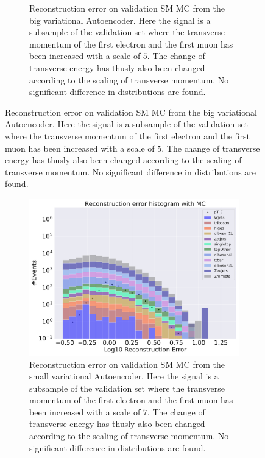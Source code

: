 \begin{figure}[h!]
\begin{subfigure}{.45\textwidth}
        \caption{Reconstruction error on validation SM MC from the big variational Autoencoder. Here the signal is a subsample of the validation 
        set where the transverse momentum of the first electron and the first muon has been increased with a scale of $5$. The change of transverse 
        energy has thusly also been changed according to the scaling of transverse momentum. No significant difference in distributions are found. }
        \label{fig:VAE_big_pt_5}
    \end{subfigure}
    \hfill 
    \label{fig:VAE_big_small_pt_5}
\end{figure}


\begin{figure}[h!]
    \centering
    \begin{subfigure}{.45\textwidth}
        \includegraphics[width=\textwidth]{Figures/VAE_testing/small/b_data_recon_big_rm3_feats_sig_pT_7.pdf}
        \caption{Reconstruction error on validation SM MC from the small variational Autoencoder. Here the signal is a subsample of the validation 
        set where the transverse momentum of the first electron and the first muon has been increased with a scale of $7$. The change of transverse 
        energy has thusly also been changed according to the scaling of transverse momentum. No significant difference in distributions are found. }
        \label{fig:VAE_small_pt_7}
    \end{subfigure}
    \hfill 
    \begin{subfigure}{.45\textwidth}

\end{subfigure}
\end{figure}
